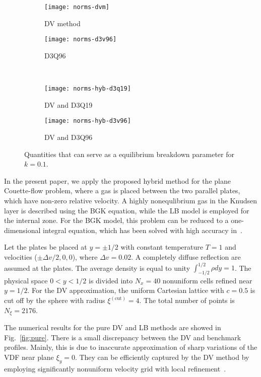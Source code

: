 \documentclass[]{elsarticle} %
\begin{document}
\begin{figure}
    \centering
    \begin{subfigure}[b]{0.5\textwidth}
        \texttt{[image: norms-dvm]}
        \caption{DV method}
        \label{fig:norms:dvm}
    \end{subfigure}%
    \begin{subfigure}[b]{0.5\textwidth}
        \texttt{[image: norms-d3v96]}
        \caption{D3Q96}
        \label{fig:norms:d3q96}
    \end{subfigure}\\
    \begin{subfigure}[b]{0.5\textwidth}
        \texttt{[image: norms-hyb-d3q19]}
        \caption{DV and D3Q19}
        \label{fig:norms:d3q19-hyb}
    \end{subfigure}%
    \begin{subfigure}[b]{0.5\textwidth}
        \texttt{[image: norms-hyb-d3v96]}
        \caption{DV and D3Q96}
        \label{fig:norms:d3q96-hyb}
    \end{subfigure}
    \caption{
       Quantities that can serve as a equilibrium breakdown parameter for \(k=0.1\).
    }\label{fig:norms}
\end{figure}

In the present paper, we apply the proposed hybrid method for the plane Couette-flow problem,
where a gas is placed between the two parallel plates, which have non-zero relative velocity.
A highly nonequlibrium gas in the Knudsen layer is described using the BGK equation, while the LB model is employed for the internal zone.
For the BGK model, this problem can be reduced to a one-dimensional integral equation,
which has been solved with high accuracy in~\cite{Luo2015, Luo2016}.

Let the plates be placed at $y = \pm 1/2$ with constant temperature $T = 1$ and velocities ($\pm\Delta v/2,0,0$), where $\Delta v=0.02$.
A completely diffuse reflection are assumed at the plates.
The average density is equal to unity $\int_{-1/2}^{1/2}\rho dy=1$.
The physical space $0 < y < 1/2$ is divided into $N_x = 40$ nonuniform cells refined near $y = 1/2$.
For the DV approximation, the uniform Cartesian lattice with $c=0.5$ is cut off by the sphere with radius $\xi^{(\mathrm{cut})}=4$.
The total number of points is $N_\xi=2176$.

The numerical results for the pure DV and LB methods are showed in Fig.~\ref{fig:pure}.
There is a small discrepancy between the DV and benchmark profiles.
Mainly, this is due to inaccurate approximation of sharp variations of the VDF near plane \(\xi_y=0\).
They can be efficiently captured by the DV method by employing significantly nonuniform velocity grid
with local refinement~\cite{Ohwada1990, Rogozin2016}.
\end{document}
